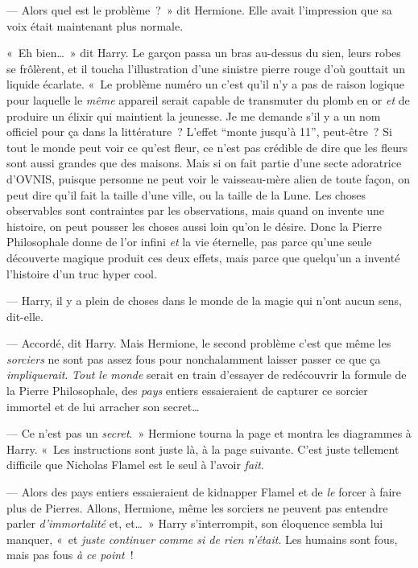 --- Alors quel est le problème~?~»
dit Hermione.
Elle avait l'impression que sa voix était maintenant plus normale.

«~Eh bien…~»
dit Harry.
Le garçon passa un bras au-dessus du sien, leurs robes se frôlèrent, et il toucha l'illustration d'une sinistre pierre rouge d'où gouttait un liquide écarlate.
«~Le problème numéro un c'est qu'il n'y a pas de raison logique pour laquelle le \emph{même} appareil serait capable de transmuter du plomb en or \emph{et} de produire un élixir qui maintient la jeunesse.
Je me demande s'il y a un nom officiel pour ça dans la littérature~?
L'effet “monte jusqu'à 11”, peut-être~?
Si tout le monde peut voir ce qu'est fleur, ce n'est pas crédible de dire que les fleurs sont aussi grandes que des maisons.
Mais si on fait partie d'une secte adoratrice d'OVNIS, puisque personne ne peut voir le vaisseau-mère alien de toute façon, on peut dire qu'il fait la taille d'une ville, ou la taille de la Lune.
Les choses observables sont contraintes par les observations, mais quand on invente une histoire, on peut pousser les choses aussi loin qu'on le désire.
Donc la Pierre Philosophale donne de l'or infini \emph{et} la vie éternelle, pas parce qu'une seule découverte magique produit ces deux effets, mais parce que quelqu'un a inventé l'histoire d'un truc hyper cool.

--- Harry, il y a plein de choses dans le monde de la magie qui n'ont aucun sens, dit-elle.

--- Accordé, dit Harry.
Mais Hermione, le second problème c'est que même les \emph{sorciers} ne sont pas assez fous pour nonchalamment laisser passer ce que ça \emph{impliquerait}.
\emph{Tout le monde} serait en train d'essayer de redécouvrir la formule de la Pierre Philosophale, des \emph{pays} entiers essaieraient de capturer ce sorcier immortel et de lui arracher son secret…

--- Ce n'est pas un \emph{secret}.~»
Hermione tourna la page et montra les diagrammes à Harry.
«~Les instructions sont juste là, à la page suivante.
C'est juste tellement difficile que Nicholas Flamel est le seul à l'avoir \emph{fait}.

--- Alors des pays entiers essaieraient de kidnapper Flamel et de \emph{le} forcer à faire plus de Pierres.
Allons, Hermione, même les sorciers ne peuvent pas entendre parler \emph{d'immortalité} et, et…~»
Harry s'interrompit, son éloquence sembla lui manquer, «~et \emph{juste continuer comme si de rien n'était}.
Les humains sont fous, mais pas fous \emph{à ce point}~!

